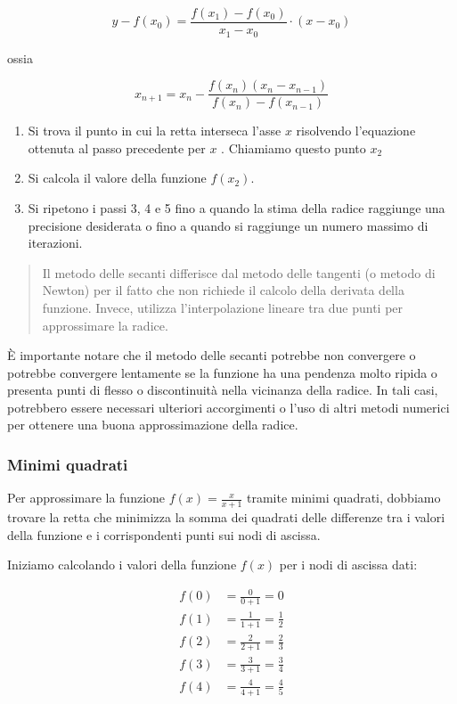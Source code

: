 \documentclass[
]{article}
\begin{document}
\[y - f(x_0) = \frac{{f(x_1) - f(x_0)}}{{x_1 - x_0}} \cdot (x - x_0)\]

ossia

\[x_{n+1}=x_n-\frac{f(x_n)(x_n-x_{n-1})}{f(x_n)-f(x_{n-1})}
\]

\begin{enumerate}
\def\labelenumi{\arabic{enumi}.}
\setcounter{enumi}{3}
\item
  Si trova il punto in cui la retta interseca l'asse \(x\) risolvendo
  l'equazione ottenuta al passo precedente per \(x\) . Chiamiamo questo
  punto \(x_2\)
\item
  Si calcola il valore della funzione \(f(x_2)\).
\item
  Si ripetono i passi 3, 4 e 5 fino a quando la stima della radice
  raggiunge una precisione desiderata o fino a quando si raggiunge un
  numero massimo di iterazioni.
\end{enumerate}

\begin{quote}
Il metodo delle secanti differisce dal metodo delle tangenti (o metodo
di Newton) per il fatto che non richiede il calcolo della derivata della
funzione. Invece, utilizza l'interpolazione lineare tra due punti per
approssimare la radice.
\end{quote}

È importante notare che il metodo delle secanti potrebbe non convergere
o potrebbe convergere lentamente se la funzione ha una pendenza molto
ripida o presenta punti di flesso o discontinuità nella vicinanza della
radice. In tali casi, potrebbero essere necessari ulteriori accorgimenti
o l'uso di altri metodi numerici per ottenere una buona approssimazione
della radice.

\subsubsection{Minimi quadrati}\label{minimi-quadrati}

Per approssimare la funzione \(f(x) = \frac{x}{x+1}\) tramite minimi
quadrati, dobbiamo trovare la retta che minimizza la somma dei quadrati
delle differenze tra i valori della funzione e i corrispondenti punti
sui nodi di ascissa.

Iniziamo calcolando i valori della funzione \(f(x)\) per i nodi di
ascissa dati:

\[
\begin{align*}
f(0) &= \frac{0}{0+1} = 0 \\
f(1) &= \frac{1}{1+1} = \frac{1}{2} \\
f(2) &= \frac{2}{2+1} = \frac{2}{3} \\
f(3) &= \frac{3}{3+1} = \frac{3}{4} \\
f(4) &= \frac{4}{4+1} = \frac{4}{5} \\
\end{align*}
\]
\end{document}
